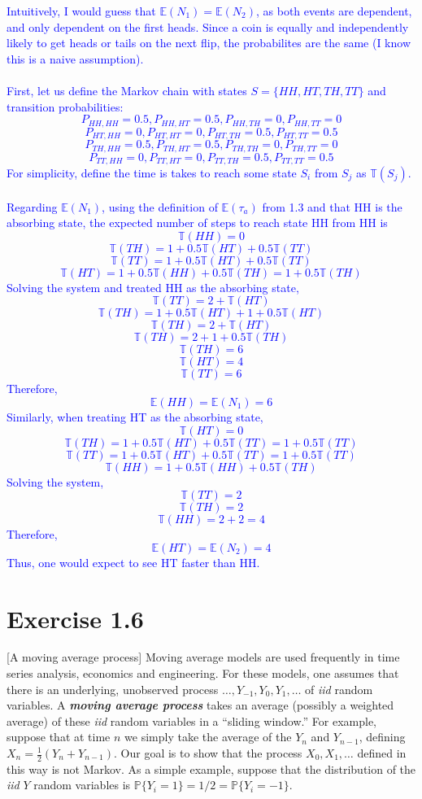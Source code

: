 \documentclass{article}
\begin{document}
\textcolor{blue}{Intuitively, I would guess that $\mathbb{E}(N_1)=\mathbb{E}(N_2)$, as both events are dependent, and only dependent on the first heads. Since a coin is equally and independently likely to get heads or tails on the next flip, the probabilites are the same (I know this is a naive assumption). \\ \\ 
First, let us define the Markov chain with states $S=\{HH, HT, TH, TT\}$ and transition probabilities: $$P_{HH,HH}=0.5, P_{HH,HT}=0.5, P_{HH,TH}=0, P_{HH,TT}=0$$ $$P_{HT,HH}=0, P_{HT,HT}=0, P_{HT,TH}=0.5, P_{HT,TT}=0.5$$ $$P_{TH,HH}=0.5, P_{TH,HT}=0.5, P_{TH,TH}=0, P_{TH,TT}=0$$ $$P_{TT,HH}=0, P_{TT,HT}=0, P_{TT,TH}=0.5, P_{TT,TT}=0.5$$
For simplicity, define the time is takes to reach some state $S_i$ from $S_j$ as $\mathbb{T}(S_j)$. \\ \\ 
Regarding $\mathbb{E}(N_1)$, using the definition of $\mathbb{E}(\tau_a)$ from 1.3 and that HH is the absorbing state, the expected number of steps to reach state HH from HH is $$\mathbb{T}(HH)=0$$
$$\mathbb{T}(TH)=1 + 0.5 \mathbb{T}(HT) + 0.5 \mathbb{T}(TT)$$
$$\mathbb{T}(TT)=1 + 0.5 \mathbb{T}(HT) + 0.5 \mathbb{T}(TT)$$
$$\mathbb{T}(HT)=1 + 0.5 \mathbb{T}(HH) + 0.5 \mathbb{T}(TH) = 1 + 0.5 \mathbb{T}(TH)$$
Solving the system and treated HH as the absorbing state,
$$\mathbb{T}(TT) = 2 + \mathbb{T}(HT)$$
$$\mathbb{T}(TH) = 1 + 0.5 \mathbb{T}(HT) + 1 + 0.5 \mathbb{T}(HT)$$
$$\mathbb{T}(TH) = 2 + \mathbb{T}(HT)$$
$$\mathbb{T}(TH) = 2 + 1 + 0.5 \mathbb{T}(TH)$$
$$\mathbb{T}(TH) = 6$$
$$\mathbb{T}(HT) = 4$$
$$\mathbb{T}(TT) = 6$$
Therefore, $$\mathbb{E}(HH)=\mathbb{E}(N_1)=6$$
Similarly, when treating HT as the absorbing state, $$\mathbb{T}(HT) = 0$$
$$\mathbb{T}(TH) = 1 + 0.5 \mathbb{T}(HT) + 0.5 \mathbb{T}(TT) = 1 + 0.5 \mathbb{T}(TT)$$
$$\mathbb{T}(TT) = 1 + 0.5 \mathbb{T}(HT) + 0.5 \mathbb{T}(TT) = 1 + 0.5 \mathbb{T}(TT)$$
$$\mathbb{T}(HH) = 1 + 0.5 \mathbb{T}(HH) + 0.5 \mathbb{T}(TH)$$
Solving the system,
$$\mathbb{T}(TT)=2$$
$$\mathbb{T}(TH)=2$$
$$\mathbb{T}(HH)=2 + 2 = 4$$
Therefore, $$\mathbb{E}(HT)=\mathbb{E}(N_2)=4$$
Thus, one would expect to see HT faster than HH.}


\section*{Exercise 1.6}
[A moving average process] Moving average models are used frequently in time series analysis, economics and engineering. For these models, one assumes that there is an underlying, unobserved process $\ldots, Y_{-1}, Y_0, Y_1, \ldots$ of \textit{iid} random variables. A \textbf{\textit{moving average process}} takes an average (possibly a weighted average) of these \textit{iid} random variables in a “sliding window.” For example, suppose that at time $n$ we simply take the average of the $Y_n$ and $Y_{n-1}$, defining $X_n = \frac{1}{2}(Y_n + Y_{n-1})$. Our goal is to show that the process $X_0, X_1, \ldots$ defined in this way is not Markov. As a simple example, suppose that the distribution of the \textit{iid} $Y$ random variables is $\mathbb{P}\{Y_i = 1\} = 1/2 = \mathbb{P}\{Y_i = -1\}$.
\end{document}

